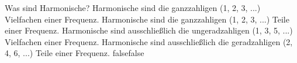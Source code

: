     {Was sind Harmonische?}
    {Harmonische sind die ganzzahligen (1, 2, 3, ...) Vielfachen einer Frequenz.}
    {Harmonische sind die ganzzahligen (1, 2, 3, ...) Teile einer Frequenz.}
    {Harmonische sind ausschließlich die ungeradzahligen (1, 3, 5, ...) Vielfachen einer Frequenz.}
    {Harmonische sind ausschließlich die geradzahligen (2, 4, 6, ...) Teile einer Frequenz.}
    {false}{false}